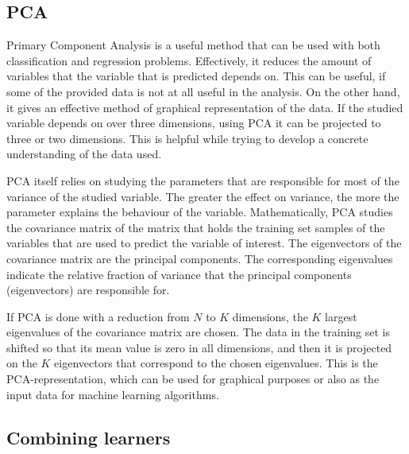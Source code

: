 \documentclass[twoside]{article}
\begin{document}
\begin{multicols}{2}
\subsection{PCA}

Primary Component Analysis is a useful method that can be used with both classification and regression
problems. Effectively, it reduces the amount of variables that the variable that is predicted depends
on. This can be useful, if some of the provided data is not at all useful in the analysis. On the other
hand, it gives an effective method of graphical representation of the data. If the studied variable
depends on over three dimensions, using PCA it can be projected to three or two dimensions. This is
helpful while trying to develop a concrete understanding of the data used.

PCA itself relies on studying the parameters that are responsible for most of the variance of the studied
variable. The greater the effect on variance, the more the parameter explains the behaviour of the variable.
Mathematically, PCA studies the covariance matrix of the matrix that holds the training set samples of the 
variables that are used to predict the variable of interest. The eigenvectors of the covariance matrix are
the principal components. The corresponding eigenvalues indicate the relative fraction of variance that
the principal components (eigenvectors) are responsible for. 

If PCA is done with a reduction from $N$ to
$K$ dimensions, the $K$ largest eigenvalues of the covariance matrix are chosen. The data in the training set is shifted so that
its mean value is zero in all dimensions, and then it is projected on the $K$ eigenvectors that correspond
to the chosen eigenvalues. This is the PCA-representation, which can be used for graphical purposes or
also as the input data for machine learning algorithms.

\subsection{Combining learners}


\end{multicols}
\end{document}
